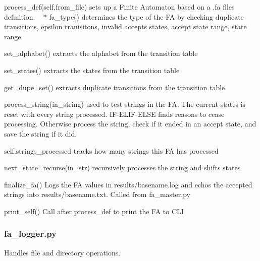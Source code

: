 \begin{DoxyItemize}
\item {\ttfamily process\+\_\+def(self,from\+\_\+file)} set\textquotesingle{}s up a Finite Automaton based on a .fa files definition. ~\newline
 $\ast$ {\ttfamily fa\+\_\+type()} determines the type of the FA by checking duplicate transitions, epsilon tranisitons, invalid accepts states, accept state range, state range
\begin{DoxyItemize}
\item {\ttfamily set\+\_\+alphabet()} extracts the alphabet from the transition table
\item {\ttfamily set\+\_\+states()} extracts the states from the transition table
\item {\ttfamily get\+\_\+dupe\+\_\+set()} extracts duplicate transitions from the transition table
\end{DoxyItemize}
\item {\ttfamily process\+\_\+string(in\+\_\+string)} used to test strings in the FA. The current states is reset with every string processed. I\+F-\/\+E\+L\+I\+F-\/\+E\+L\+SE finds reasons to cease processing. Otherwise process the string, check if it ended in an accept state, and save the string if it did.
\begin{DoxyItemize}
\item {\ttfamily self.\+strings\+\_\+processed} tracks how many strings this FA has processed
\item {\ttfamily next\+\_\+state\+\_\+recurse(in\+\_\+str)} recursively processes the string and shifts states
\end{DoxyItemize}
\item {\ttfamily finalize\+\_\+fa()} Logs the FA values in results/basename.\+log and echos the accepted strings into results/basename.\+txt. Called from {\ttfamily fa\+\_\+master.\+py}
\item {\ttfamily print\+\_\+self()} Call after {\ttfamily process\+\_\+def} to print the FA to C\+LI
\end{DoxyItemize}

\subsubsection*{fa\+\_\+logger.\+py}

Handles file and directory operations.


